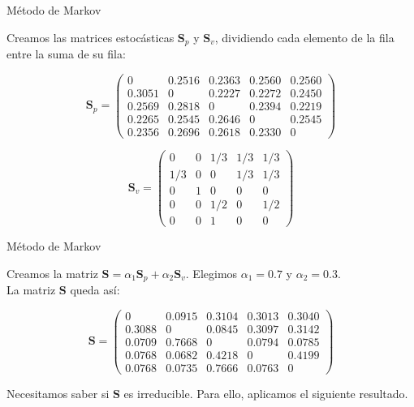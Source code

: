 \documentclass[10pt]{beamer}
\begin{document}
	\begin{frame}{Método de Markov}
		\begin{ejemplo}[continuación]
			Creamos las matrices estocásticas $\mathbf{S}_p$ y $\mathbf{S}_v$, dividiendo cada elemento de la fila entre la suma de su fila:
			
			\[ \mathbf{S}_p = \left(\begin{array}{rrrrr}
			0      & 0.2516 & 0.2363 & 0.2560 & 0.2560 \\
			0.3051 & 0      & 0.2227 & 0.2272 & 0.2450 \\
			0.2569 & 0.2818 & 0      & 0.2394 & 0.2219 \\
			0.2265 & 0.2545 & 0.2646 & 0      & 0.2545 \\
			0.2356 & 0.2696 & 0.2618 & 0.2330 & 0
			\end{array}\right) \] 
			
			\[ \mathbf{S}_v = \left(\begin{array}{rrrrr}
			0     & 0   & 1/3 & 1/3 & 1/3\\
			1/3   & 0   & 0   & 1/3 & 1/3\\
			0     & 1   & 0   & 0   & 0  \\
			0     & 0   & 1/2 & 0   & 1/2\\
			0     & 0   & 1   & 0   & 0
			\end{array}\right) \]
			
			
		\end{ejemplo}
	\end{frame}
	
	\begin{frame}{Método de Markov}
		\begin{ejemplo}[continuación]
		Creamos la matriz $\mathbf{S} = \alpha_1 \mathbf{S}_p + \alpha_2 \mathbf{S}_v$. Elegimos $\alpha_1 = 0.7$ y $\alpha_2 = 0.3$.\\
		
		La matriz $\mathbf{S}$ queda así:
		
		\[ \mathbf{S} = \left(\begin{array}{rrrrr}
		0      & 0.0915 & 0.3104 & 0.3013 & 0.3040 \\
		0.3088 & 0      & 0.0845 & 0.3097 & 0.3142 \\
		0.0709 & 0.7668 & 0      & 0.0794 & 0.0785 \\
		0.0768 & 0.0682 & 0.4218 & 0      & 0.4199 \\
		0.0768 & 0.0735 & 0.7666 & 0.0763 & 0
		
		\end{array}\right) \]
		
		Necesitamos saber si $\mathbf{S}$ es irreducible. Para ello, aplicamos el siguiente resultado.
		\end{ejemplo}
	\end{frame}
	
\end{document}
